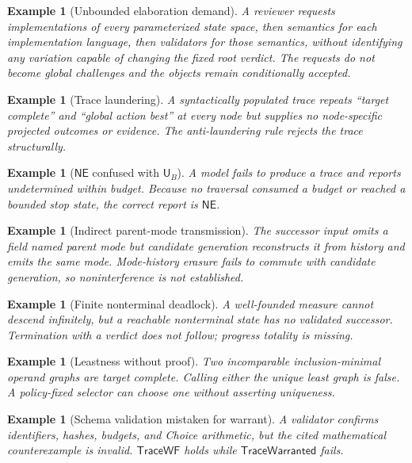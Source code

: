 \documentclass[10pt]{article}
\newtheorem{example}[definition]{Example}
\newcommand{\UB}{\mathsf{U}_B}
\newcommand{\NE}{\mathsf{NE}}
\newcommand{\TraceWF}{\mathsf{TraceWF}}
\newcommand{\TraceW}{\mathsf{TraceWarranted}}
\begin{document}
\begin{example}[Unbounded elaboration demand]
A reviewer requests implementations of every parameterized state space, then semantics for each implementation language, then validators for those semantics, without identifying any variation capable of changing the fixed root verdict.  The requests do not become global challenges and the objects remain conditionally accepted.
\end{example}

\begin{example}[Trace laundering]
A syntactically populated trace repeats ``target complete'' and ``global action best'' at every node but supplies no node-specific projected outcomes or evidence.  The anti-laundering rule rejects the trace structurally.
\end{example}

\begin{example}[$\NE$ confused with $\UB$]
A model fails to produce a trace and reports undetermined within budget.  Because no traversal consumed a budget or reached a bounded stop state, the correct report is $\NE$.
\end{example}

\begin{example}[Indirect parent-mode transmission]
The successor input omits a field named parent mode but candidate generation reconstructs it from history and emits the same mode.  Mode-history erasure fails to commute with candidate generation, so noninterference is not established.
\end{example}

\begin{example}[Finite nonterminal deadlock]
A well-founded measure cannot descend infinitely, but a reachable nonterminal state has no validated successor.  Termination with a verdict does not follow; progress totality is missing.
\end{example}

\begin{example}[Leastness without proof]
Two incomparable inclusion-minimal operand graphs are target complete.  Calling either the unique least graph is false.  A policy-fixed selector can choose one without asserting uniqueness.
\end{example}

\begin{example}[Schema validation mistaken for warrant]
A validator confirms identifiers, hashes, budgets, and Choice arithmetic, but the cited mathematical counterexample is invalid.  $\TraceWF$ holds while $\TraceW$ fails.
\end{example}
\end{document}
